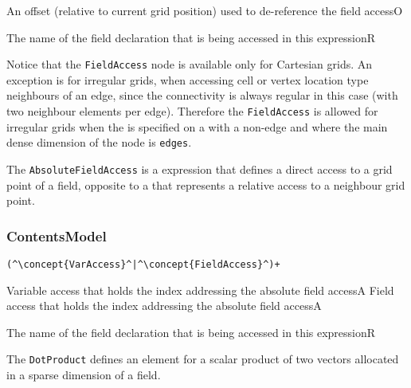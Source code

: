 \begin{HIRChildElements} 
	{An offset (relative to current grid position) used to de-reference the field access}{O}
\end{HIRChildElements}
\begin{HIRAttributes}
	{The name of the field declaration that is being accessed in this expression}{R}
\end{HIRAttributes}

Notice that the {\tt FieldAccess} node is available only for 
Cartesian grids. 
An exception is for irregular grids, when accessing cell or vertex
location type neighbours of an edge, since the connectivity is always
regular in this case (with two neighbour elements per edge). 
Therefore the {\tt FieldAccess} is allowed for irregular grids
when the  is specified on a  with 
a non-edge  and where the main 
dense dimension of the  node is {\tt edges}.

The {\tt AbsoluteFieldAccess} is a expression that defines a direct access to a grid point of a field, 
opposite to a  that
represents a relative access to a neighbour grid point.

\subsubsection*{ContentsModel}{}

\begin{lstlisting}[style=default,frame=none]
(^\concept{VarAccess}^|^\concept{FieldAccess}^)+
\end{lstlisting}

\begin{HIRChildElements} 
	{Variable access that holds the index addressing the absolute field access}{A}
	{Field access that holds the index addressing the absolute field access}{A}
\end{HIRChildElements}
\begin{HIRAttributes}
	{The name of the field declaration that is being accessed in this expression}{R}
\end{HIRAttributes}

The {\tt DotProduct} defines an element for a scalar product
of two vectors allocated in a sparse dimension of a field.

